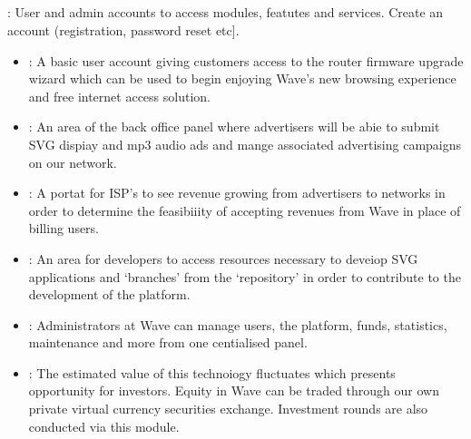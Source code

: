 \documentclass[letterpaper,10pt,openany,oneside,english]{sphinxmanual}
\begin{document}
\subsection{}
\label{\detokenize{overview:back-end}}
: User and admin accounts to access modules, featutes and services. Create an account (registration, password reset etc{]}.
\begin{itemize}
\item {} 
: A basic user account giving customers access to the router firmware upgrade wizard which can be used to begin enjoying Wave’s new browsing experience and free internet access solution.

\item {} 
: An area of the back office panel where advertisers will be abie to submit SVG dispiay and mp3 audio ads and mange associated advertising campaigns on our network.

\item {} 
: A portat for ISP’s to see revenue growing from advertisers to networks in order to determine the feasibiiity of accepting revenues from Wave in place of billing users.

\item {} 
: An area for developers to access resources necessary to deveiop SVG applications and ‘branches’ from the ‘repository’ in order to contribute to the development of the platform.

\item {} 
: Administrators at Wave can manage users, the platform, funds, statistics, maintenance and more from one centialised panel.

\item {} 
: The estimated value of this technoiogy fluctuates which presents opportunity for investors. Equity in Wave can be traded through our own private virtual currency securities exchange. Investment rounds are also conducted via this module.

\end{itemize}
\end{document}
